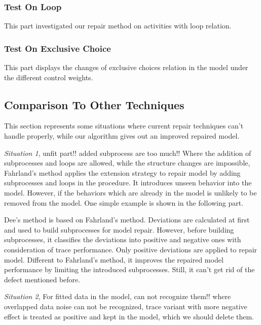 \subsubsection{Test On Loop}
This part investigated our repair method on activities with loop relation.

\subsubsection{Test On Exclusive Choice}
This part displays the changes of exclusive choices relation in the model under the different control weights.

\subsection{Comparison To Other Techniques}
This section represents some situations where current repair techniques can't handle properly, while our algorithm gives out an improved repaired model. 

\emph{Situation 1}, unfit part!! added subprocess are too much!! Where the addition of subprocesses and loops are allowed, while the structure changes are impossible, 
Fahrland's method applies the extension strategy to repair model by adding subprocesses and loops in the procedure. It introduces unseen behavior into the model. However, if the behaviors which are already in the model is unlikely to be removed from the model. One simple example is shown in the following part. 

Dee's method is based on Fahrland's method. Deviations are calculated at first and used to build subprocesses for model repair. However, before building subprocesses, it classifies the deviations into positive and negative ones with consideration of trace performance. Only positive deviations are applied to repair model. Different to Fahrland's method, it improves the repaired model performance by limiting the introduced subprocesses. Still, it can't get rid of the defect mentioned before. 

\emph{Situation 2}, For fitted data in the model, can not recognize them!! where overlapped data noise can not be recognized, trace variant with more negative effect is treated as positive and kept in the model, which we should delete them.   

